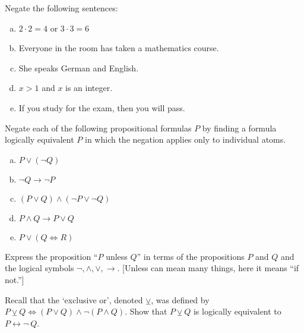 \documentclass[11pt,letterpaper]{article}
\begin{document}
 Negate the following sentences:
	\begin{enumerate}[(a)]
	\item $2 \cdot 2= 4$ or $3 \cdot 3= 6$
	\item Everyone in the room has taken a mathematics course.
	\item She speaks German and English. 
	\item $x > 1$ and $x$ is an integer.
	\item If you study for the exam, then you will pass. 
	\end{enumerate}





\newpage





 Negate each of the following propositional formulas $P$ by finding a formula logically equivalent $P$ in which the negation applies only to individual atoms. 
	\begin{enumerate}[(a)]
	\item $P \vee (\neg Q)$
	\item $\neg Q \to \neg P$
	\item $(P \vee Q) \wedge (\neg P \vee \neg Q)$
	\item $P \wedge Q \to P \vee Q$
	\item $P \vee (Q \Leftrightarrow R)$
	\end{enumerate}





\newpage





 Express the proposition ``$P$ unless $Q$'' in terms of the propositions $P$ and $Q$ and the logical symbols $\neg, \wedge, \vee, \to$. [Unless can mean many things, here it means ``if not.''] \pspace





\newpage





 Recall that the `exclusive or', denoted $\veebar$, was defined by $P \veebar Q \Leftrightarrow (P \vee Q) \wedge \neg (P \wedge Q)$. Show that $P \veebar Q$ is logically equivalent to $P \leftrightarrow \neg\ Q$. \pspace
\end{document}
